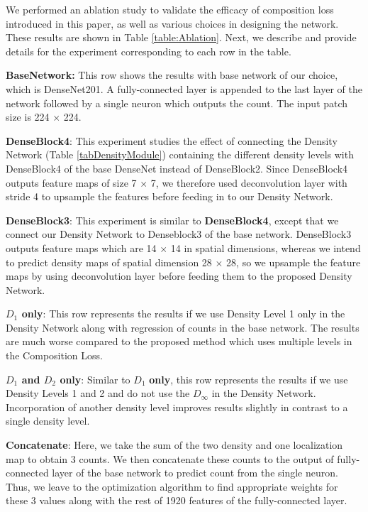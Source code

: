 \documentclass[runningheads]{llncs}
\newcommand{\cross}[1]{#1 $\times$ #1}
\begin{document}
We performed an ablation study to validate the efficacy of composition loss introduced in this paper, as well as various choices in designing the network. These results are shown in Table \ref{table:Ablation}. Next, we describe and provide details for the experiment corresponding to each row in the table.

\smallskip

\noindent\textbf{BaseNetwork:} This row shows the results with base network of our choice, which is DenseNet201. A fully-connected layer is appended to the last layer of the network followed by a single neuron which outputs the count. The input patch size is \cross{224}.

\smallskip

\noindent\textbf{DenseBlock4}: This experiment studies the effect of connecting the Density Network (Table \ref{tabDensityModule}) containing the different density levels with DenseBlock4 of the base DenseNet instead of DenseBlock2. Since DenseBlock4 outputs feature maps of size \cross{7}, we therefore used deconvolution layer with stride 4 to upsample the features before feeding in to our Density Network.

\smallskip

\noindent\textbf{DenseBlock3}: This experiment is similar to \textbf{DenseBlock4}, except that we connect our Density Network to Denseblock3 of the base network. DenseBlock3 outputs feature maps which are \cross{14} in spatial dimensions,  whereas we intend to predict density maps of spatial dimension \cross{28}, so we upsample the feature maps by using deconvolution layer before feeding them to the proposed Density Network.

\smallskip

\noindent\textbf{$D_1$ only}: This row represents the results if we use Density Level 1 only in the Density Network along with regression of counts in the base network. The results are much worse compared to the proposed method which uses multiple levels in the Composition Loss.

\smallskip

\noindent\textbf{$D_1$ and $D_2$ only}: Similar to $D_1$ \textbf{only}, this row represents the results if we use Density Levels 1 and 2 and do not use the $D_\infty$ in the Density Network. Incorporation of another density level improves results slightly in contrast to a single density level.

\smallskip

\noindent\textbf{Concatenate}: Here, we take the sum of the two density and one localization map to obtain $3$ counts. We then concatenate these counts to the output of fully-connected layer of the base network to predict count from the single neuron. Thus, we leave to the optimization algorithm to find appropriate weights for these 3 values along with the rest of 1920 features of the fully-connected layer.
\end{document}

